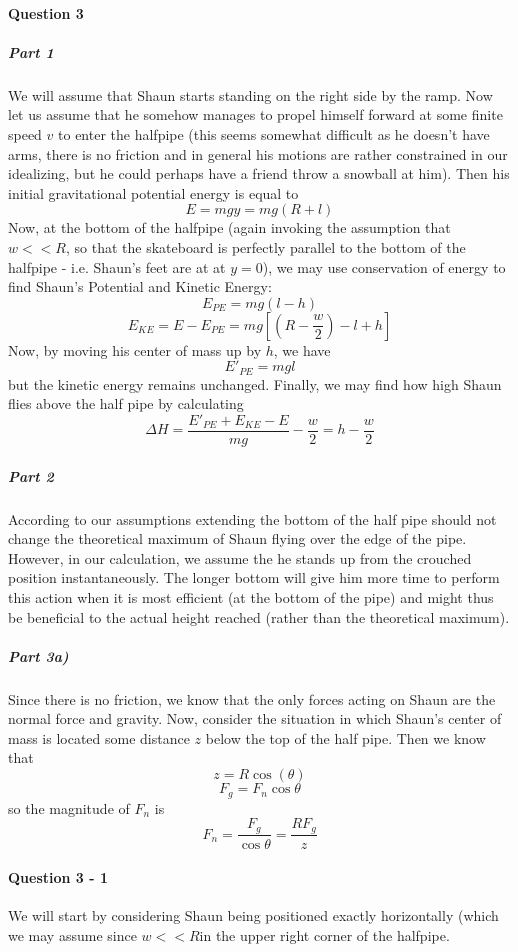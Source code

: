 \paragraph{Question 3}
\subparagraph{Part 1}
We will assume that Shaun starts standing on the right side by the ramp. Now let us assume that he somehow manages to propel himself forward at some finite speed $v$ to enter the halfpipe (this seems somewhat difficult as he doesn't have arms, there is no friction and in general his motions are rather constrained in our idealizing, but he could perhaps have a friend throw a snowball at him). 
Then his initial gravitational potential energy is equal to
\[ E = mgy = mg(R+l) \]
Now, at the bottom of the halfpipe (again invoking the assumption that $w<<R$, so that the skateboard is perfectly parallel to the bottom of the halfpipe - i.e. Shaun's feet are at at $y=0$), we may use conservation of energy to find Shaun's Potential and Kinetic Energy:
\[ E_{PE} = mg(l-h) \]
\[ E_{KE} = E - E_{PE} = mg[(R-\frac{w}{2})-l+h] \]
Now, by moving his center of mass up by $h$, we have
\[ E'_{PE} = mgl \]
but the kinetic energy remains unchanged. Finally, we may find how high Shaun flies above the half pipe by calculating
\[ \Delta H = \frac{E'_{PE}+E_{KE}-E}{mg} - \frac{w}{2} = h- \frac{w}{2}  \]
\subparagraph{Part 2}
According to our assumptions extending the bottom of the half pipe should not change the theoretical maximum of Shaun flying over the edge of the pipe. However, in our calculation, we assume the he stands up from the crouched position instantaneously. The longer bottom will give him more time to perform this action when it is most efficient (at the bottom of the pipe) and might thus be beneficial to the actual height reached (rather than the theoretical maximum).

\subparagraph{Part 3a)}
Since there is no friction, we know that the only forces acting on Shaun are the normal force and gravity. Now, consider the situation in which Shaun's center of mass is located some distance $z$ below the top of the half pipe. Then we know that
\[ z=R\cos(\theta) \]
\[ F_g = F_n\cos\theta \] 
so the magnitude of $F_n$ is 
\[ F_n = \frac{F_g}{\cos\theta} = \frac{RF_g}{z} \]



\paragraph{Question 3 - 1}
We will start by considering Shaun being positioned exactly horizontally (which we may assume since $w << R$in the upper right corner of the halfpipe.

